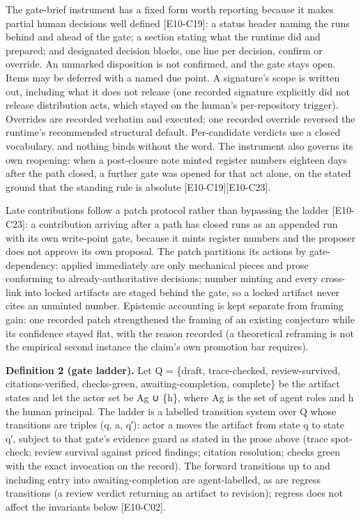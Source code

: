 \documentclass[
  11pt,
]{article}
\begin{document}
The gate-brief instrument has a fixed form worth reporting because it
makes partial human decisions well defined {[}E10-C19{]}: a status
header naming the runs behind and ahead of the gate; a section stating
what the runtime did and prepared; and designated decision blocks, one
line per decision, confirm or override. An unmarked disposition is not
confirmed, and the gate stays open. Items may be deferred with a named
due point. A signature's scope is written out, including what it does
not release (one recorded signature explicitly did not release
distribution acts, which stayed on the human's per-repository trigger).
Overrides are recorded verbatim and executed; one recorded override
reversed the runtime's recommended structural default. Per-candidate
verdicts use a closed vocabulary, and nothing binds without the word.
The instrument also governs its own reopening: when a post-closure note
minted register numbers eighteen days after the path closed, a further
gate was opened for that act alone, on the stated ground that the
standing rule is absolute {[}E10-C19{]}{[}E10-C23{]}.

Late contributions follow a patch protocol rather than bypassing the
ladder {[}E10-C23{]}: a contribution arriving after a path has closed
runs as an appended run with its own write-point gate, because it mints
register numbers and the proposer does not approve its own proposal. The
patch partitions its actions by gate-dependency: applied immediately are
only mechanical pieces and prose conforming to already-authoritative
decisions; number minting and every cross-link into locked artifacts are
staged behind the gate, so a locked artifact never cites an unminted
number. Epistemic accounting is kept separate from framing gain: one
recorded patch strengthened the framing of an existing conjecture while
its confidence stayed flat, with the reason recorded (a theoretical
reframing is not the empirical second instance the claim's own promotion
bar requires).

\textbf{Definition 2 (gate ladder).} Let Q = \{draft, trace-checked,
review-survived, citations-verified, checks-green, awaiting-completion,
complete\} be the artifact states and let the actor set be Ag ∪ \{h\},
where Ag is the set of agent roles and h the human principal. The ladder
is a labelled transition system over Q whose transitions are triples (q,
a, q′): actor a moves the artifact from state q to state q′, subject to
that gate's evidence guard as stated in the prose above (trace
spot-check; review survival against priced findings; citation
resolution; checks green with the exact invocation on the record). The
forward transitions up to and including entry into awaiting-completion
are agent-labelled, as are regress transitions (a review verdict
returning an artifact to revision); regress does not affect the
invariants below {[}E10-C02{]}.
\end{document}
